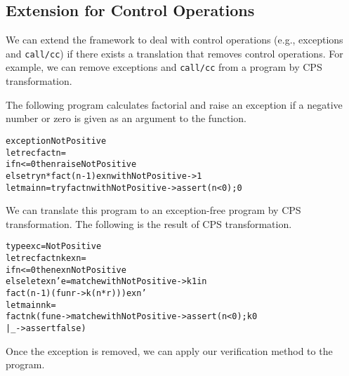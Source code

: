 \subsection{Extension for Control Operations}
\label{sec:control}
We can extend the framework to deal with control operations (e.g., exceptions and \texttt{call/cc}) if there
exists a translation that removes control operations.  For example,
we can remove exceptions and \texttt{call/cc} from a program by CPS transformation.

The following program calculates factorial and raise an exception if
a negative number or zero is given as an argument to the function.
\begin{alltt}
exception NotPositive
let rec fact n =
  if n <= 0 then raise NotPositive
  else try n * fact (n - 1) exn with NotPositive -> 1
let main n = try fact n with NotPositive -> assert (n < 0); 0
\end{alltt}
We can translate this program to an exception-free program by CPS transformation.
The following is the result of CPS transformation.
\begin{alltt}
type exc = NotPositive
let rec fact n k exn =
  if n <= 0 then exn NotPositive
  else let exn' e = match e with NotPositive -> k 1 in
         fact (n - 1) (fun r -> k (n * r))) exn'
let main n k =
  fact n k (fun e -> match e with NotPositive -> assert (n < 0); k 0
                                | _ -> assert false)
\end{alltt}
Once the exception is removed, we can apply our verification method to the
program.


